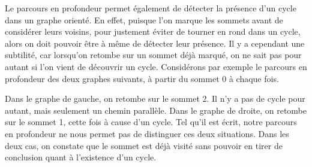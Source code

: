 \documentclass{magnolia}
\begin{document}
Le parcours en profondeur permet également de détecter la présence d'un cycle dans un
graphe orienté. En effet, puisque l'on marque les sommets avant de considérer leurs voisins,
pour justement éviter de tourner en rond dans un cycle, alors on doit pouvoir être à même
de détecter leur présence. Il y a cependant une subtilité, car lorsqu'on retombe
sur un sommet déjà marqué, on ne sait pas pour autant si l'on vient de découvrir un cycle.
Considérons par exemple le parcours en profondeur des deux graphes suivants, à partir
du sommet 0 à chaque fois.

\begin{center}
\hspace{2cm}
\end{center}
\noindent
Dans le graphe de gauche, on retombe sur le sommet 2. Il n'y a pas de cycle pour autant,
mais seulement un chemin parallèle. Dans le graphe de droite, on retombe sur
le sommet 1, cette fois à cause d'un cycle. Tel qu'il est écrit, notre parcours en
profondeur ne nous permet pas de distinguer ces deux situations. Dans les deux cas, 
on constate que le sommet est déjà visité sans pouvoir en tirer de conclusion quant à
l'existence d'un cycle.\\
\end{document}
